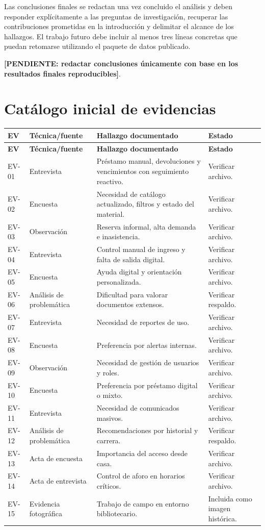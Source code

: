 \documentclass[12pt,journal,onecolumn]{IEEEtran}
\newcommand{\pendiente}[1]{\textcolor{red!70!black}{\textbf{[PENDIENTE: #1]}}}
\begin{document}
Las conclusiones finales se redactan una vez concluido el análisis y deben
responder explícitamente a las preguntas de investigación, recuperar las
contribuciones prometidas en la introducción y delimitar el alcance de los
hallazgos. El trabajo futuro debe incluir al menos tres líneas concretas que
puedan retomarse utilizando el paquete de datos publicado.

\pendiente{redactar conclusiones únicamente con base en los resultados finales reproducibles}.

\appendices
\section{Catálogo inicial de evidencias}
\begin{longtable}{P{0.12\textwidth}P{0.23\textwidth}P{0.45\textwidth}P{0.13\textwidth}}\toprule
\textbf{EV} & \textbf{Técnica/fuente} & \textbf{Hallazgo documentado} & \textbf{Estado}\\\midrule\endfirsthead
\toprule\textbf{EV} & \textbf{Técnica/fuente} & \textbf{Hallazgo documentado} & \textbf{Estado}\\\midrule\endhead
EV-01 & Entrevista & Préstamo manual, devoluciones y vencimientos con seguimiento reactivo. & Verificar archivo.\\
EV-02 & Encuesta & Necesidad de catálogo actualizado, filtros y estado del material. & Verificar archivo.\\
EV-03 & Observación & Reserva informal, alta demanda e inasistencia. & Verificar archivo.\\
EV-04 & Entrevista & Control manual de ingreso y falta de salida digital. & Verificar archivo.\\
EV-05 & Encuesta & Ayuda digital y orientación personalizada. & Verificar archivo.\\
EV-06 & Análisis de problemática & Dificultad para valorar documentos extensos. & Verificar respaldo.\\
EV-07 & Entrevista & Necesidad de reportes de uso. & Verificar archivo.\\
EV-08 & Encuesta & Preferencia por alertas internas. & Verificar archivo.\\
EV-09 & Observación & Necesidad de gestión de usuarios y roles. & Verificar archivo.\\
EV-10 & Encuesta & Preferencia por préstamo digital o mixto. & Verificar archivo.\\
EV-11 & Entrevista & Necesidad de comunicados masivos. & Verificar archivo.\\
EV-12 & Análisis de problemática & Recomendaciones por historial y carrera. & Verificar respaldo.\\
EV-13 & Acta de encuesta & Importancia del acceso desde casa. & Verificar archivo.\\
EV-14 & Acta de entrevista & Control de aforo en horarios críticos. & Verificar archivo.\\
EV-15 & Evidencia fotográfica & Trabajo de campo en entorno bibliotecario. & Incluida como imagen histórica.\\\bottomrule
\end{longtable}



\nocite{*}


\end{document}
